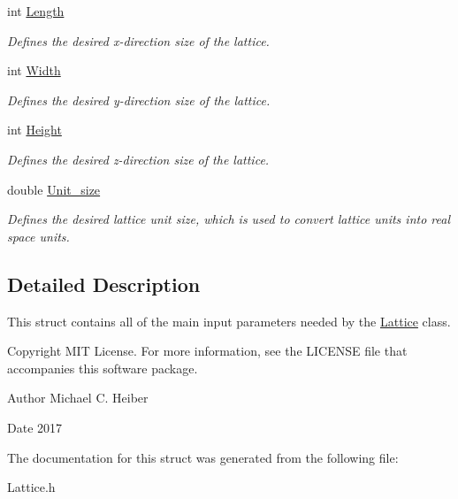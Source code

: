 \begin{DoxyCompactItemize}
\mbox{\label{struct_parameters___lattice_a99c7d553111bb660032bb7ca6f592da6}} 
int \hyperlink{struct_parameters___lattice_a99c7d553111bb660032bb7ca6f592da6}{Length}
\begin{DoxyCompactList}\small\item\em Defines the desired x-\/direction size of the lattice. \end{DoxyCompactList}\item 
\mbox{\label{struct_parameters___lattice_a40f8633b47d204f471d041a0d8216e5b}} 
int \hyperlink{struct_parameters___lattice_a40f8633b47d204f471d041a0d8216e5b}{Width}
\begin{DoxyCompactList}\small\item\em Defines the desired y-\/direction size of the lattice. \end{DoxyCompactList}\item 
\mbox{\label{struct_parameters___lattice_a1b59e1a307ad945fb86f44b68354f605}} 
int \hyperlink{struct_parameters___lattice_a1b59e1a307ad945fb86f44b68354f605}{Height}
\begin{DoxyCompactList}\small\item\em Defines the desired z-\/direction size of the lattice. \end{DoxyCompactList}\item 
\mbox{\label{struct_parameters___lattice_a5f9628b968ba4206a7650c774827b1f0}} 
double \hyperlink{struct_parameters___lattice_a5f9628b968ba4206a7650c774827b1f0}{Unit\+\_\+size}
\begin{DoxyCompactList}\small\item\em Defines the desired lattice unit size, which is used to convert lattice units into real space units. \end{DoxyCompactList}\end{DoxyCompactItemize}


\subsection{Detailed Description}
This struct contains all of the main input parameters needed by the \hyperlink{class_lattice}{Lattice} class. 

\begin{DoxyCopyright}{Copyright}
M\+IT License. For more information, see the L\+I\+C\+E\+N\+SE file that accompanies this software package. 
\end{DoxyCopyright}
\begin{DoxyAuthor}{Author}
Michael C. Heiber 
\end{DoxyAuthor}
\begin{DoxyDate}{Date}
2017 
\end{DoxyDate}


The documentation for this struct was generated from the following file\+:\begin{DoxyCompactItemize}
\item 
Lattice.\+h\end{DoxyCompactItemize}
